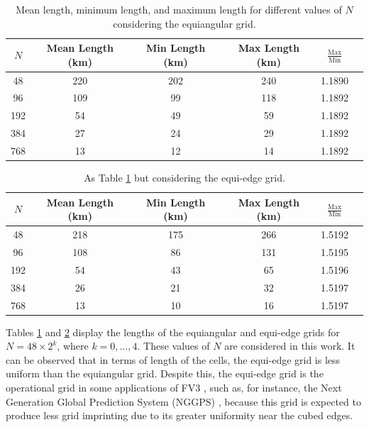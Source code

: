 \documentclass[preprint,12pt]{elsarticle}
\begin{document}
\begin{linenumbers}
\begin{table}[htbp]
	\centering
	\caption{Mean length, minimum length, and maximum length for different values of $N$ considering the equiangular grid.\label{g2-dx-table}}
	\begin{tabular}{|c|c|c|c|c|c}\hline
		$N$ & Mean Length (km) & Min Length (km) & Max Length (km) & $\frac{\text{Max}}{\text{Min}}$ \\ \hline
		48 & 220 & 202 & 240 & 1.1890 \\
		96 & 109 & 99 & 118  & 1.1892 \\
		192 & 54 & 49 & 59  & 1.1892 \\
		384 & 27 & 24 & 29  & 1.1892 \\
		768 & 13 & 12 & 14  & 1.1892\\
		\hline
	\end{tabular} 
\end{table}
\begin{table}[htbp]
	\centering
	\caption{As Table \ref{g2-dx-table} but considering the equi-edge grid. \label{g0-dx-table}}
	\begin{tabular}{|c|c|c|c|c|c}\hline
		$N$ & Mean Length (km) & Min Length (km) & Max Length (km) & $\frac{\text{Max}}{\text{Min}}$ \\ \hline 
		48 & 218 & 175 & 266 & 1.5192 \\
		96 & 108 & 86 & 131 & 1.5195 \\
		192 & 54 & 43 & 65 & 1.5196 \\
		384 & 26 & 21 & 32 & 1.5197 \\
		768 & 13 & 10 & 16 & 1.5197 \\
		\hline
	\end{tabular}
\end{table}

Tables  \ref{g2-dx-table} and \ref{g0-dx-table} display the lengths of the  equiangular and equi-edge grids for $N=48\times 2^k$, 
where $k = 0,\ldots, 4$. These values of $N$ are considered in this work.
It can be observed that in terms of length of the cells, the equi-edge grid is less uniform than the equiangular grid.
Despite this, the equi-edge grid is the operational grid in some applications of FV3 \cite{harris:2021,chen:2021}, such as, for instance, 
the Next Generation Global Prediction System (NGGPS) \cite{zhou:2019}, 
because this grid is expected to produce less grid imprinting due to its greater uniformity near the cubed edges.


\end{linenumbers}
\end{document}
